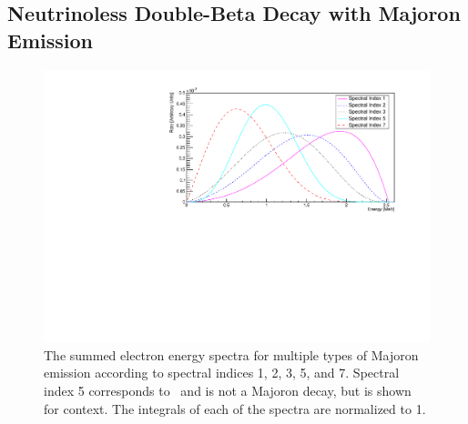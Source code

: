 \subsection{Neutrinoless Double-Beta Decay with Majoron Emission}
\label{ssec:Neutrinoless Double-Beta Decay with Majoron Emisison}

\begin{figure}
    \centering
    \includegraphics[width=0.8\linewidth]{Figures/EnergySpectrum_fixedFermi.pdf}
    \caption[The summed electron energy spectra for multiple types of Majoron emission according to spectral indices 1, 2, 3, 5, and 7.]{The summed electron energy spectra for multiple types of Majoron emission according to spectral indices 1, 2, 3, 5, and 7. Spectral index 5 corresponds to \twonubb~and is not a Majoron decay, but is shown for context. The integrals of each of the spectra are normalized to 1.}
    \label{fig:Majoron Spectrum}
\end{figure}

